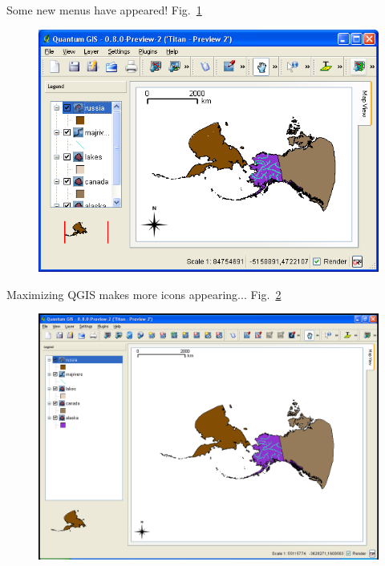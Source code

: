 Some new menus have appeared! Fig.~\ref{fig:qgis011}

\begin{figure}[htbp]
   \centering
   \includegraphics[scale=0.35]{qgis011.png}
   \caption{}
   \label{fig:qgis011}
\end{figure}


Maximizing QGIS makes more icons appearing... Fig.~\ref{fig:qgis012}

\begin{figure}[htbp]
   \centering
   \includegraphics[scale=0.2]{qgis012.png}
   \caption{}
   \label{fig:qgis012}
\end{figure}


